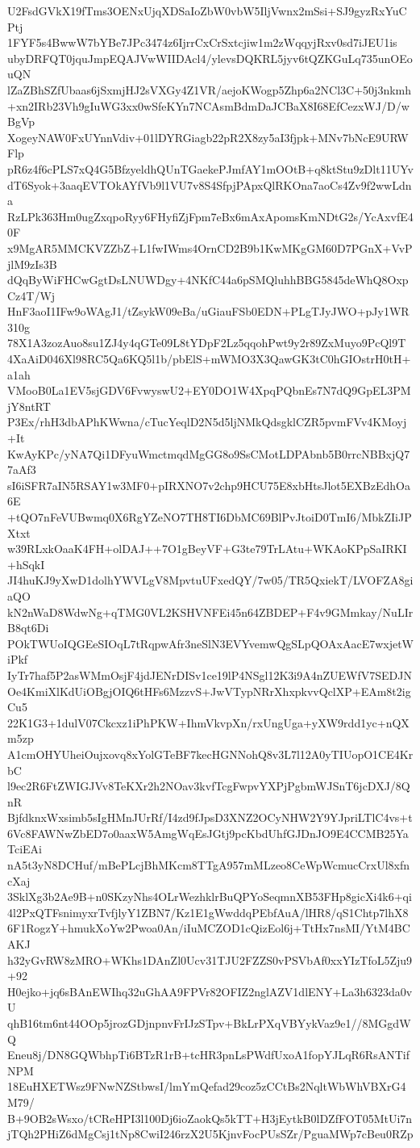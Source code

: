 U2FsdGVkX19fTms3OENxUjqXDSaIoZbW0vbW5IljVwnx2mSsi+SJ9gyzRxYuCPtj
1FYF5s4BwwW7bYBe7JPc3474z6IjrrCxCrSxtcjiw1m2zWqqyjRxv0sd7iJEU1is
ubyDRFQT0jquJmpEQAJVwWIIDAcl4/ylevsDQKRL5jyv6tQZKGuLq735unOEouQN
lZaZBhSZfUbaas6jSxmjHJ2sVXGy4Z1VR/aejoKWogp5Zhp6a2NCl3C+50j3nkmh
+xn2IRb23Vh9gIuWG3xx0wSfeKYn7NCAsmBdmDaJCBaX8I68EfCezxWJ/D/wBgVp
XogeyNAW0FxUYnnVdiv+01lDYRGiagb22pR2X8zy5aI3fjpk+MNv7bNcE9URWFlp
pR6z4f6cPLS7xQ4G5BfzyeldhQUnTGaekePJmfAY1mOOtB+q8ktStu9zDlt11UYv
dT6Syok+3aaqEVTOkAYfVb9l1VU7v8S4SfpjPApxQlRKOna7aoCs4Zv9f2wwLdna
RzLPk363Hm0ugZxqpoRyy6FHyfiZjFpm7eBx6mAxApomsKmNDtG2s/YcAxvfE40F
x9MgAR5MMCKVZZbZ+L1fwIWms4OrnCD2B9b1KwMKgGM60D7PGnX+VvPjlM9zIs3B
dQqByWiFHCwGgtDsLNUWDgy+4NKfC44a6pSMQluhhBBG5845deWhQ8OxpCz4T/Wj
HnF3aoI1IFw9oWAgJ1/tZsykW09eBa/uGiauFSb0EDN+PLgTJyJWO+pJy1WR310g
78X1A3zozAuo8su1ZJ4y4qGTe09L8tYDpF2Lz5qqohPwt9y2r89ZxMuyo9PcQl9T
4XaAiD046Xl98RC5Qa6KQ5l1b/pbElS+mWMO3X3QawGK3tC0hGIOstrH0tH+a1ah
VMooB0La1EV5sjGDV6FvwyswU2+EY0DO1W4XpqPQbnEs7N7dQ9GpEL3PMjY8ntRT
P3Ex/rhH3dbAPhKWwna/cTucYeqlD2N5d5ljNMkQdsgklCZR5pvmFVv4KMoyj+It
KwAyKPc/yNA7Qi1DFyuWmctmqdMgGG8o9SsCMotLDPAbnb5B0rrcNBBxjQ77aAf3
sI6iSFR7aIN5RSAY1w3MF0+pIRXNO7v2chp9HCU75E8xbHtsJlot5EXBzEdhOa6E
+tQO7nFeVUBwmq0X6RgYZeNO7TH8TI6DbMC69BlPvJtoiD0TmI6/MbkZIiJPXtxt
w39RLxkOaaK4FH+olDAJ++7O1gBeyVF+G3te79TrLAtu+WKAoKPpSaIRKI+hSqkI
JI4huKJ9yXwD1dolhYWVLgV8MpvtuUFxedQY/7w05/TR5QxiekT/LVOFZA8giaQO
kN2nWaD8WdwNg+qTMG0VL2KSHVNFEi45n64ZBDEP+F4v9GMmkay/NuLIrB8qt6Di
POkTWUoIQGEeSIOqL7tRqpwAfr3neSlN3EVYvemwQgSLpQOAxAacE7wxjetWiPkf
IyTr7haf5P2asWMmOsjF4jdJENrDISv1ce19lP4NSgl12K3i9A4nZUEWfV7SEDJN
Oe4KmiXlKdUiOBgjOIQ6tHFs6MzzvS+JwVTypNRrXhxpkvvQclXP+EAm8t2igCu5
22K1G3+1dulV07Ckcxz1iPhPKW+IhmVkvpXn/rxUngUga+yXW9rdd1yc+nQXm5zp
A1cmOHYUheiOujxovq8xYolGTeBF7kecHGNNohQ8v3L7l12A0yTIUopO1CE4KrbC
l9ec2R6FtZWIGJVv8TeKXr2h2NOav3kvfTcgFwpvYXPjPgbmWJSnT6jcDXJ/8QnR
BjfdknxWxsimb5sIgHMnJUrRf/I4zd9fJpsD3XNZ2OCyNHW2Y9YJpriLTlC4vs+t
6Vc8FAWNwZbED7o0aaxW5AmgWqEsJGtj9pcKbdUhfGJDnJO9E4CCMB25YaTciEAi
nA5t3yN8DCHuf/mBePLcjBhMKcm8TTgA957mMLzeo8CeWpWcmucCrxUl8xfncXaj
3SklXg3b2Ae9B+n0SKzyNhs4OLrWezhklrBuQPYoSeqmnXB53FHp8gicXi4k6+qi
4l2PxQTFsnimyxrTvfjlyY1ZBN7/Kz1E1gWwddqPEbfAuA/lHR8/qS1Chtp7lhX8
6F1RogzY+hmukXoYw2Pwoa0An/iIuMCZOD1cQizEol6j+TtHx7nsMI/YtM4BCAKJ
h32yGvRW8zMRO+WKhs1DAnZl0Ucv31TJU2FZZS0vPSVbAf0xxYIzTfoL5Zju9+92
H0ejko+jq6sBAnEWIhq32uGhAA9FPVr82OFIZ2nglAZV1dlENY+La3h6323da0vU
qhB16tm6nt44OOp5jrozGDjnpnvFrIJzSTpv+BkLrPXqVBYykVaz9e1//8MGgdWQ
Eneu8j/DN8GQWbhpTi6BTzR1rB+tcHR3pnLsPWdfUxoA1fopYJLqR6RsANTifNPM
18EuHXETWsz9FNwNZStbwsI/lmYmQefad29coz5zCCtBs2NqltWbWhVBXrG4M79/
B+9OB2sWsxo/tCReHPI3l100Dj6ioZaokQs5kTT+H3jEytkB0lDZfFOT05MtUi7n
jTQh2PHiZ6dMgCsj1tNp8CwiI246rzX2U5KjnvFocPUsSZr/PguaMWp7cBeu0RZp
